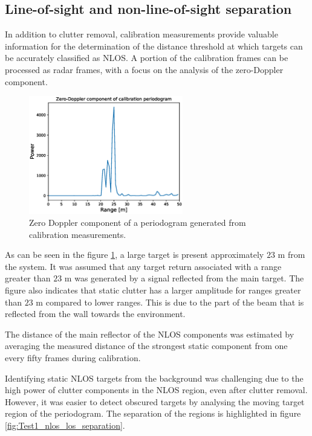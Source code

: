 \subsection{Line-of-sight and non-line-of-sight separation}

In addition to clutter removal, calibration measurements provide valuable information for the determination of the distance threshold at which targets can be accurately classified as NLOS. A portion of the calibration frames can be processed as radar frames, with a focus on the analysis of the zero-Doppler component.
	

\begin{figure}[H]
	\centering
	\includegraphics[width=0.6\textwidth]{Images/Test1/cali_static_per_t1.eps}
	\caption{Zero Doppler component of a periodogram generated from calibration measurements.}
	\label{fig:Test1_cali_static_per}
\end{figure}

As can be seen in the figure \ref{fig:Test1_cali_static_per}, a large target is present approximately $23$ m from the system. It was assumed that any target return associated with a range greater than $23$ m was generated by a signal reflected from the main target. The figure also indicates that static clutter has a larger amplitude for ranges greater than $23$ m compared to lower ranges. This is due to the part of the beam that is reflected from the wall towards the environment.

The distance of the main reflector of the NLOS components was estimated by averaging the measured distance of the strongest static component from one every fifty frames during calibration.

Identifying static NLOS targets from the background was challenging due to the high power of clutter components in the NLOS region, even after clutter removal. However, it was easier to detect obscured targets by analysing the moving target region of the periodogram. The separation of the regions is highlighted in figure \ref{fig:Test1_nlos_los_separation}.

